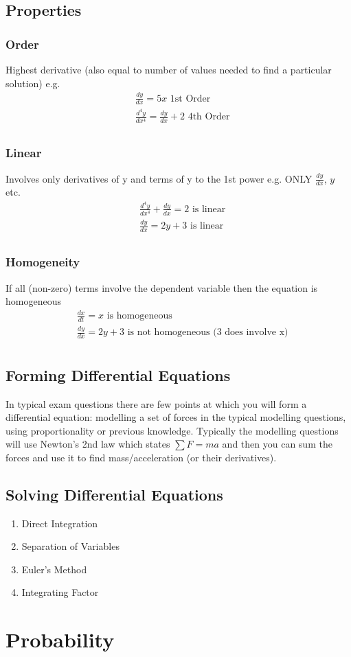 \documentclass[12pt] {article}
\begin{document}
\subsection*{Properties}
\subsubsection*{Order}
Highest derivative (also equal to number of values needed to find a particular solution) e.g.
\begin{align*}
    &\frac{dy}{dx} = 5x \text{ 1st Order} \\
    &\frac{d^4y}{dx^4} = \frac{dy}{dx} + 2 \text{ 4th Order} \\
\end{align*}

\subsubsection*{Linear}
Involves only derivatives of y and terms of y to the 1st power e.g. ONLY $\frac{dy}{dx}$, $y$ etc.
\begin{align*}
    &\frac{d^4y}{dx^4} + \frac{dy}{dx} = 2 \text{ is linear} \\
    &\frac{dy}{dx} = 2y + 3 \text{ is linear} \\
\end{align*}

\subsubsection*{Homogeneity} 
If all (non-zero) terms involve the dependent variable then the equation is homogeneous
\begin{align*}
    &\frac{dx}{dt} = x \text{ is homogeneous} \\
    &\frac{dy}{dx} = 2y + 3 \text{ is not homogeneous (3 does involve x)} \\
\end{align*}

\subsection*{Forming Differential Equations}
In typical exam questions there are few points at which you will form a differential equation: modelling a set 
of forces in the typical modelling questions, using proportionality or previous knowledge. Typically the modelling 
questions will use Newton's 2nd law which states $\sum F = ma$ and then you can sum the forces and use it to find
mass/acceleration (or their derivatives). 

\subsection*{Solving Differential Equations}
\begin{enumerate} 
    \item Direct Integration
    \item Separation of Variables 
    \item Euler's Method    
    \item Integrating Factor
\end{enumerate}

\section{Probability}
\end{document}
